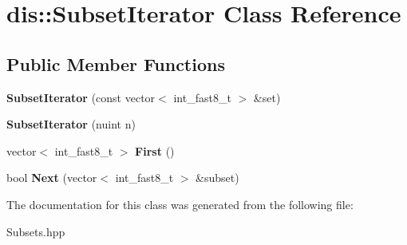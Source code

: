 \hypertarget{classdis_1_1_subset_iterator}{\section{dis\-:\-:Subset\-Iterator Class Reference}
\label{classdis_1_1_subset_iterator}
}
\subsection*{Public Member Functions}
\begin{DoxyCompactItemize}
\item 
\hypertarget{classdis_1_1_subset_iterator_a1caa12c3ef4856e114bed04d28f04cfa}{{\bfseries Subset\-Iterator} (const vector$<$ int\-\_\-fast8\-\_\-t $>$ \&set)}\label{classdis_1_1_subset_iterator_a1caa12c3ef4856e114bed04d28f04cfa}

\item 
\hypertarget{classdis_1_1_subset_iterator_af69a90a68086a6e93cbcc8355d311928}{{\bfseries Subset\-Iterator} (nuint n)}\label{classdis_1_1_subset_iterator_af69a90a68086a6e93cbcc8355d311928}

\item 
\hypertarget{classdis_1_1_subset_iterator_a2a0975913b9419361e66640fa572c436}{vector$<$ int\-\_\-fast8\-\_\-t $>$ {\bfseries First} ()}\label{classdis_1_1_subset_iterator_a2a0975913b9419361e66640fa572c436}

\item 
\hypertarget{classdis_1_1_subset_iterator_adebce125a156d006936bade779b68e13}{bool {\bfseries Next} (vector$<$ int\-\_\-fast8\-\_\-t $>$ \&subset)}\label{classdis_1_1_subset_iterator_adebce125a156d006936bade779b68e13}

\end{DoxyCompactItemize}


The documentation for this class was generated from the following file\-:\begin{DoxyCompactItemize}
\item 
Subsets.\-hpp\end{DoxyCompactItemize}
